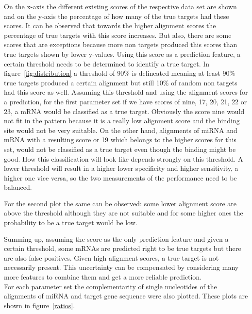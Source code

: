 \documentclass[12pt]{article}
\begin{document}
On the x-axis the different existing scores of the respective data set are shown and on the y-axis the percentage of how many of the true targets had these scores. It can be observed that towards the higher alignment scores the percentage of true targets with this score increases. But also, there are some scores that are exceptions because more non targets produced this scores than true targets shown by lower y-values. Using this score as a prediction feature, a certain threshold needs to be determined to identify a true target. In figure~\ref{fig:distribution} a threshold of 90\% is delineated meaning at least 90\% true targets produced a certain alignment but still 10\% of random non targets had this score as well. Assuming this threshold and using the alignment scores for a prediction, for the first parameter set if we have scores of nine, 17, 20, 21, 22 or 23, a mRNA would be classified as a true target. Obviously the score nine would not fit in the pattern because it is a really low alignment score and the binding site would not be very suitable. On the other hand, alignments of miRNA and mRNA with a resulting score or 19 which belongs to the higher scores for this set, would not be classified as a true target even though the binding might be good. How this classification will look like depends strongly on this threshold. A lower threshold will result in a higher lower specificity and higher sensitivity, a higher one vice versa, so the two measurements of the performance need to be balanced.

For the second plot the same can be observed: some lower alignment score are above the threshold although they are not suitable and for some higher ones the probability to be a true target would be low.

Summing up, assuming the score as the only prediction feature and given a certain threshold, some mRNAs are predicted right to be true targets but there are also false positives. Given high alignment scores, a true target is not necessarily present. This uncertainty can be compensated by considering many more features to combine them and get a more reliable prediction.\\ 


For each parameter set the complementarity of single nucleotides of the alignments of miRNA and target gene sequence were also plotted. These plots are shown in figure~\ref{ratios}.
\end{document}
